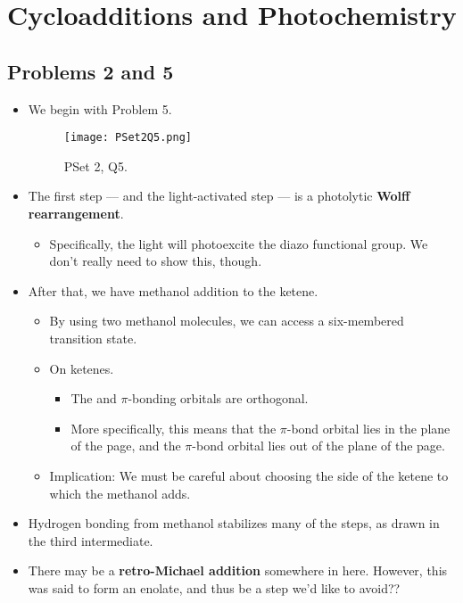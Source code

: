 \documentclass[../notes.tex]{subfiles}
\begin{document}
\chapter{Cycloadditions and Photochemistry}
\section{Problems 2 and 5}
\begin{itemize}
    \item {}We begin with Problem 5.
    \begin{figure}[h!]
        \centering
        \texttt{[image: PSet2Q5.png]}
        \caption{PSet 2, Q5.}
        \label{fig:PSet2Q5}
    \end{figure}
    \item The first step --- and the light-activated step --- is a photolytic \textbf{Wolff rearrangement}.
    \begin{itemize}
        \item Specifically, the light will photoexcite the diazo functional group. We don't really need to show this, though.
    \end{itemize}
    \item After that, we have methanol addition to the ketene.
    \begin{itemize}
        \item By using two methanol molecules, we can access a six-membered transition state.
        \item On ketenes.
        \begin{itemize}
            \item The  and  $\pi$-bonding orbitals are orthogonal.
            \item More specifically, this means that the  $\pi$-bond orbital lies in the plane of the page, and the  $\pi$-bond orbital lies out of the plane of the page.
        \end{itemize}
        \item Implication: We must be careful about choosing the side of the ketene to which the methanol adds.
    \end{itemize}
    \item Hydrogen bonding from methanol stabilizes many of the steps, as drawn in the third intermediate.
    \item There may be a \textbf{retro-Michael addition} somewhere in here. However, this was said to form an enolate, and thus be a step we'd like to avoid??

\end{itemize}
\end{document}
